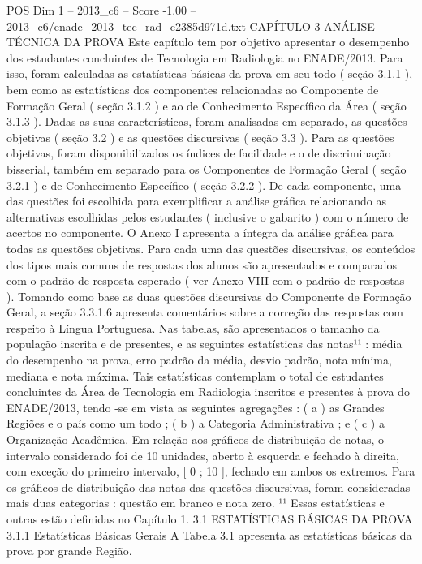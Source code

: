 \begin{textsample}{POS Dim 1 – 2013\_c6 – Score -1.00 – 2013\_c6/enade\_2013\_tec\_rad\_c2385d971d.txt}  \label{ex:f1_pos_177}
CAPÍTULO 3 ANÁLISE TÉCNICA DA PROVA Este capítulo tem por objetivo apresentar o desempenho dos estudantes concluintes de Tecnologia em Radiologia no ENADE/2013.
Para isso, foram calculadas as estatísticas básicas da prova em seu todo ( seção 3.1.1 ), bem como as estatísticas dos componentes relacionadas ao Componente de Formação Geral ( seção 3.1.2 ) e ao de Conhecimento Específico da Área ( seção 3.1.3 ).
Dadas as suas características, foram analisadas em separado, as questões objetivas ( seção 3.2 ) e as questões discursivas ( seção 3.3 ).
Para as questões objetivas, foram disponibilizados os índices de facilidade e o de discriminação bisserial, também em separado para os Componentes de Formação Geral ( seção 3.2.1 ) e de Conhecimento Específico ( seção 3.2.2 ).
De cada componente, uma das questões foi escolhida para exemplificar a análise gráfica relacionando as alternativas escolhidas pelos estudantes ( inclusive o gabarito ) com o número de acertos no componente.
O Anexo I apresenta a íntegra da análise gráfica para todas as questões objetivas.
Para cada uma das questões discursivas, os conteúdos dos tipos mais comuns de respostas dos alunos são apresentados e comparados com o padrão de resposta esperado ( ver Anexo VIII com o padrão de respostas ).
Tomando como base as duas questões discursivas do Componente de Formação Geral, a seção 3.3.1.6 apresenta comentários sobre a correção das respostas com respeito à Língua Portuguesa.
Nas tabelas, são apresentados o tamanho da população inscrita e de presentes, e as seguintes estatísticas das notas¹¹ : média do desempenho na prova, erro padrão da média, desvio padrão, nota mínima, mediana e nota máxima.
Tais estatísticas contemplam o total de estudantes concluintes da Área de Tecnologia em Radiologia inscritos e presentes à prova do ENADE/2013, tendo -se em vista as seguintes agregações : ( a ) as Grandes Regiões e o país como um todo ; ( b ) a Categoria Administrativa ; e ( c ) a Organização Acadêmica.
Em relação aos gráficos de distribuição de notas, o intervalo considerado foi de 10 unidades, aberto à esquerda e fechado à direita, com exceção do primeiro intervalo, [ 0 ; 10 ], fechado em ambos os extremos.
Para os gráficos de distribuição das notas das questões discursivas, foram consideradas mais duas categorias : questão em branco e nota zero. ¹¹ Essas estatísticas e outras estão definidas no Capítulo 1. 3.1 ESTATÍSTICAS BÁSICAS DA PROVA 3.1.1 Estatísticas Básicas Gerais A Tabela 3.1 apresenta as estatísticas básicas da prova por grande Região.

\end{textsample}
